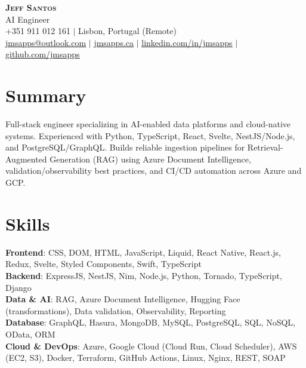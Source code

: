 \documentclass[letterpaper,11pt]{article}
\begin{document}
\begin{center}
    \textbf{\Huge \scshape Jeff Santos} \\ \vspace{2pt}
    \small AI Engineer \\ \vspace{2pt}
    \small +351 911 012 161 $|$
    Lisbon, Portugal (Remote) \\
		\href{mailto:jmsapps@outlook.com}{\underline{jmsapps@outlook.com}} $|$
    \href{https://jmsapps.ca}{\underline{jmsapps.ca}} $|$
    \href{https://www.linkedin.com/in/jmsapps/}{\underline{linkedin.com/in/jmsapps}} $|$
    \href{https://github.com/jmsapps}{\underline{github.com/jmsapps}}
\end{center}


\section{Summary}
\begin{itemize}[leftmargin=0.15in, label={}]
  \small{\item{
    Full-stack engineer specializing in AI-enabled data platforms and cloud-native systems. Experienced with Python, TypeScript, React, Svelte, NestJS/Node.js, and PostgreSQL/GraphQL. Builds reliable ingestion pipelines for Retrieval-Augmented Generation (RAG) using Azure Document Intelligence, validation/observability best practices, and CI/CD automation across Azure and GCP.
  }}
\end{itemize}

\section{Skills}
 \begin{itemize}[leftmargin=0.15in, label={}]
    \small{\item{
      \textbf{Frontend}{: CSS, DOM, HTML, JavaScript, Liquid, React Native, React.js, Redux, Svelte, Styled Components, Swift, TypeScript} \\
      \textbf{Backend}{: ExpressJS, NestJS, Nim, Node.js, Python, Tornado, TypeScript, Django} \\
      \textbf{Data \& AI}{: RAG, Azure Document Intelligence, Hugging Face (transformations), Data validation, Observability, Reporting} \\
      \textbf{Database}{: GraphQL, Hasura, MongoDB, MySQL, PostgreSQL, SQL, NoSQL, OData, ORM} \\
      \textbf{Cloud \& DevOps}{: Azure, Google Cloud (Cloud Run, Cloud Scheduler), AWS (EC2, S3), Docker, Terraform, GitHub Actions, Linux, Nginx, REST, SOAP}
    }}
 \end{itemize}
\end{document}
